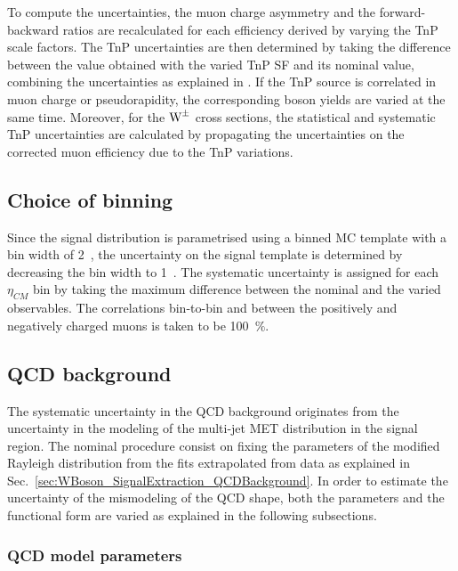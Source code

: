 To compute the uncertainties, the muon charge asymmetry and the forward-backward ratios are recalculated for each efficiency derived by varying the TnP scale factors. The TnP uncertainties are then determined by taking the difference between the value obtained with the varied TnP SF and its nominal value, combining the uncertainties as explained in . If the TnP source is correlated in muon charge or pseudorapidity, the corresponding \W boson yields are varied at the same time. Moreover, for the $\text{W}^{\pm}$ cross sections, the statistical and systematic TnP uncertainties are calculated by propagating the uncertainties on the corrected muon efficiency due to the TnP variations.

\subsection{Choice of binning}


Since the \W signal distribution is parametrised using a binned MC template with a bin width of 2~\GeVc, the uncertainty on the signal template is determined by decreasing the bin width to 1~\GeVc. The systematic uncertainty is assigned for each $\eta_{CM}$ bin by taking the maximum difference between the nominal and the varied observables. The correlations bin-to-bin and between the positively and negatively charged muons is taken to be 100~$\%$.


\subsection{QCD background}

The systematic uncertainty in the QCD background originates from the uncertainty in the modeling of the multi-jet MET distribution in the signal region. The nominal procedure consist on fixing the parameters of the modified Rayleigh distribution from the fits extrapolated from data as explained in Sec.~\ref{sec:WBoson_SignalExtraction_QCDBackground}. In order to estimate the uncertainty of the mismodeling of the QCD shape, both the parameters and the functional form are varied as explained in the following subsections.

\subsubsection{QCD model parameters}


